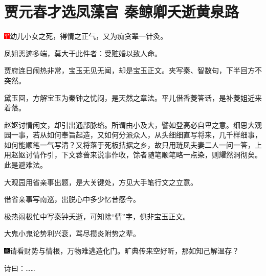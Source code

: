 

\chapter{贾元春才选凤藻宫 秦鲸卿夭逝黄泉路}

{\includegraphics[width=3mm]{../Images/00002}\kaishu 幼儿小女之死，得情之正气，又为痴贪辈一针灸。}

{\kaishu 凤姐恶迹多端，莫大于此件者：受赃婚以致人命。}

{\kaishu 贾府连日闹热非常，宝玉无见无闻，却是宝玉正文。夹写秦、智数句，下半回方不突然。}

{\kaishu 黛玉回，方解宝玉为秦钟之忧闷，是天然之章法。平儿借香菱答话，是补菱姐近来着落。}

{\kaishu 赵妪讨情闲文，却引出通部脉络。所谓由小及大，譬如登高必自卑之意。细思大观园一事，若从如何奉旨起造，又如何分派众人，从头细细直写将来，几千样细事，如何能顺笔一气写清？又将落于死板拮据之乡，故只用琏凤夫妻二人一问一答，上用赵妪讨情作引，下文蓉蔷来说事作收，馀者随笔顺笔略一点染，则耀然洞彻矣。此是避难法。}

{\kaishu 大观园用省亲事出题，是大关键处，方见大手笔行文之立意。}

{\kaishu 借省亲事写南巡，出脱心中多少忆昔感今。}

{\kaishu 极热闹极忙中写秦钟夭逝，可知除``情''字，俱非宝玉正文。}

{\kaishu 大鬼小鬼论势利兴衰，骂尽攒炎附势之辈。}

{\includegraphics[width=3mm]{../Images/00005}请看财势与情根，万物难逃造化门。旷典传来空好听，那如知己解温存？}

诗曰：\ldots{}\ldots{}

